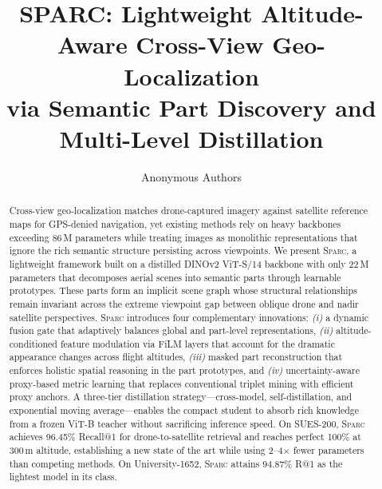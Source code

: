 \documentclass[sigconf, anonymous, review]{acmart}
\newcommand{\ours}{\textsc{Sparc}}
\begin{document}
\title{SPARC: Lightweight Altitude-Aware Cross-View Geo-Localization \\via Semantic Part Discovery and Multi-Level Distillation}

\author{Anonymous Authors}

\renewcommand{\shortauthors}{Anonymous Authors}

\begin{abstract}
Cross-view geo-localization matches drone-captured imagery against satellite reference maps for GPS-denied navigation, yet existing methods rely on heavy backbones exceeding 86\,M parameters while treating images as monolithic representations that ignore the rich semantic structure persisting across viewpoints.
We present \ours{}, a lightweight framework built on a distilled DINOv2 ViT-S/14 backbone with only 22\,M parameters that decomposes aerial scenes into semantic parts through learnable prototypes.
These parts form an implicit scene graph whose structural relationships remain invariant across the extreme viewpoint gap between oblique drone and nadir satellite perspectives.
\ours{} introduces four complementary innovations: \emph{(i)} a dynamic fusion gate that adaptively balances global and part-level representations, \emph{(ii)} altitude-conditioned feature modulation via FiLM layers that account for the dramatic appearance changes across flight altitudes, \emph{(iii)} masked part reconstruction that enforces holistic spatial reasoning in the part prototypes, and \emph{(iv)} uncertainty-aware proxy-based metric learning that replaces conventional triplet mining with efficient proxy anchors.
A three-tier distillation strategy---cross-model, self-distillation, and exponential moving average---enables the compact student to absorb rich knowledge from a frozen ViT-B teacher without sacrificing inference speed.
On SUES-200, \ours{} achieves 96.45\% Recall@1 for drone-to-satellite retrieval and reaches perfect 100\% at 300\,m altitude, establishing a new state of the art while using 2--4$\times$ fewer parameters than competing methods.
On University-1652, \ours{} attains 94.87\% R@1 as the lightest model in its class.
\end{abstract}
\end{document}
